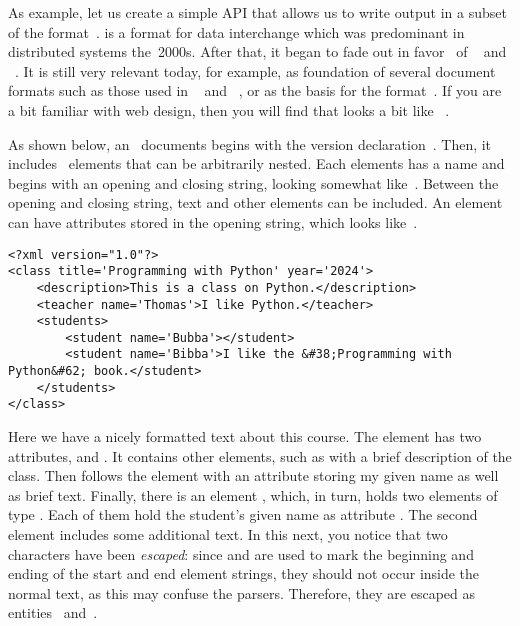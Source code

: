 As example, let us create a simple API that allows us to write output in a subset of the  format~\cite{BPSMM2008EMLX1FE,K2019ITXJY,CH2013XFCAMLTMC}.
 is a format for data interchange which was predominant in distributed systems the~2000s.
After that, it began to fade out in favor~\cite{A2020XLATDOEOL} of ~\cite{E2017SE4TJDIS,RFC8259} and ~\cite{DNMAASBE2021YAMLYV1,K2019ITXJY,CGTYB2022YFFDCAIE}.
It is still very relevant today, for example, as foundation of several document formats such as those used in \libreoffice~\cite{DF2024LTDF,GL2012LTSOOSSCBAFACSOL} and \microsoftWord~\cite{MS2024MW,DR2019STFAWAUMW}, or as the basis for the  format~\cite{DDGLMSWFJJ2011SVGSSE}.
If you are a bit familiar with web design, then you will find that  looks a bit like ~\cite{HBFLDNOP2014HAVAAAFHAX}.%
%
\begin{sloppypar}%
As shown below, an ~documents begins with the  version declaration~.
Then, it includes ~elements that can be arbitrarily nested.
Each elements has a name and begins with an opening and closing string, looking somewhat like~.
Between the opening and closing string, text and other elements can be included.
An element can have attributes stored in the opening string, which looks like~.%
\end{sloppypar}%
%
\begin{center}
\begin{minipage}{\linewidth}%
\begin{lstlisting}[style=xml_style]
<?xml version="1.0"?>
<class title='Programming with Python' year='2024'>
    <description>This is a class on Python.</description>
    <teacher name='Thomas'>I like Python.</teacher>
    <students>
        <student name='Bubba'></student>
        <student name='Bibba'>I like the &#38;Programming with Python&#62; book.</student>
    </students>
</class>
\end{lstlisting}%
\end{minipage}%
\end{center}%
%
Here we have a nicely formatted  text about this course.
The  element has two attributes,  and .
It contains other elements, such as  with a brief description of the class.
Then follows the element  with an attribute storing my given name as well as brief text.
Finally, there is an element , which, in turn, holds two elements of type .
Each of them hold the student's given name as attribute .
The second  element includes some additional text.
In this next, you notice that two characters have been \emph{escaped}: since \textil{<} and \textil{>} are used to mark the beginning and ending of the start and end element strings, they should not occur inside the normal text, as this may confuse the  parsers.
Therefore, they are escaped as entities~ and~.

